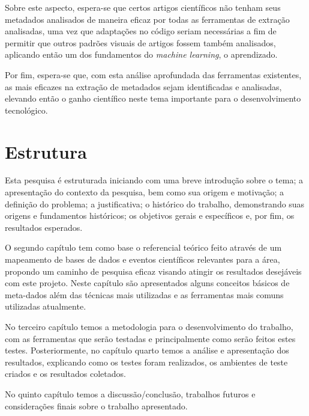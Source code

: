 Sobre este aspecto, espera-se que certos artigos científicos não tenham seus metadados analisados de maneira eficaz por todas as ferramentas de extração analisadas, uma vez que adaptações no código seriam necessárias a fim de permitir que outros padrões visuais de artigos fossem também analisados, aplicando então um dos fundamentos do \textit{machine learning}, o aprendizado. 

Por fim, espera-se que, com esta análise aprofundada das ferramentas existentes, as mais eficazes na extração de metadados sejam identificadas e analisadas, elevando então o ganho científico neste tema importante para o desenvolvimento tecnológico.


\section{Estrutura}
\label{sec:structure}

Esta pesquisa é estruturada iniciando com uma breve introdução sobre o tema; a apresentação do contexto da pesquisa, bem como sua origem e motivação; a definição do problema; a justificativa; o histórico do trabalho, demonstrando suas origens e fundamentos históricos; os objetivos gerais e específicos e, por fim, os resultados esperados.

\begin{textedited}
O segundo capítulo tem como base o referencial teórico feito através de um mapeamento de bases de dados e eventos científicos relevantes para a área, propondo um caminho de pesquisa eficaz visando atingir os resultados desejáveis com este projeto. Neste capítulo são apresentados alguns conceitos básicos de meta-dados além das técnicas mais utilizadas e as ferramentas mais comuns utilizadas atualmente.
\end{textedited}

\begin{textedited}
No terceiro capítulo temos a metodologia para o desenvolvimento do trabalho, com as ferramentas que serão testadas e principalmente como serão feitos estes testes. Posteriormente, no capítulo quarto temos a análise e apresentação dos resultados, explicando como os testes foram realizados, os ambientes de teste criados e os resultados coletados.
\end{textedited}

No quinto capítulo temos a discussão/conclusão, trabalhos futuros e considerações finais sobre o trabalho apresentado.


